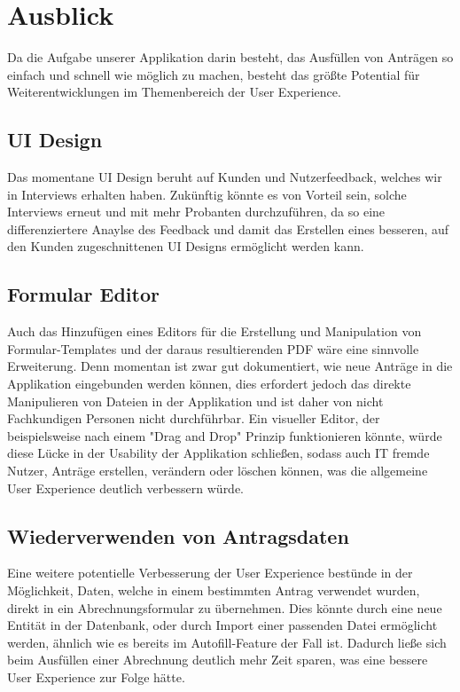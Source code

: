 \chapter{Ausblick}\label{ch:ausblick}

Da die Aufgabe unserer Applikation darin besteht, das Ausfüllen von Anträgen so einfach 
und schnell wie möglich zu machen, besteht das größte Potential für Weiterentwicklungen
im Themenbereich der User Experience.

\section{\ac{UI} Design}\label{sec: ui design}
Das momentane \ac{UI} Design beruht auf Kunden und Nutzerfeedback, welches wir in 
Interviews erhalten haben. Zukünftig könnte es von Vorteil sein, solche Interviews 
erneut und mit mehr Probanten durchzuführen, da so eine differenziertere Anaylse
des Feedback und damit das Erstellen eines besseren, auf den Kunden zugeschnittenen \ac{UI} 
Designs ermöglicht werden kann.

\section{Formular Editor}\label{sec: formular editor}
Auch das Hinzufügen eines Editors für die Erstellung und Manipulation von 
Formular-Templates und der daraus resultierenden PDF wäre eine sinnvolle Erweiterung. Denn 
momentan ist zwar gut dokumentiert, wie neue Anträge in die Applikation eingebunden werden 
können, dies erfordert jedoch das direkte Manipulieren von Dateien in der Applikation 
und ist daher von nicht Fachkundigen Personen nicht durchführbar. Ein visueller Editor, der 
beispielsweise nach einem "Drag and Drop" Prinzip funktionieren könnte, würde diese Lücke 
in der Usability der Applikation schließen, sodass auch IT fremde Nutzer, Anträge 
erstellen, verändern oder löschen können, was die allgemeine User Experience deutlich 
verbessern würde.

\section{Wiederverwenden von Antragsdaten}\label{sec: wiederverwenden von Antragsdaten}
Eine weitere potentielle Verbesserung der User Experience bestünde in der Möglichkeit, 
Daten, welche in einem bestimmten Antrag verwendet wurden, direkt in ein 
Abrechnungsformular zu übernehmen. Dies könnte durch eine neue Entität in der Datenbank, 
oder durch Import einer passenden Datei ermöglicht werden, ähnlich wie es bereits im 
Autofill-Feature der Fall ist. Dadurch ließe sich beim Ausfüllen einer Abrechnung deutlich 
mehr Zeit sparen, was eine bessere User Experience zur Folge hätte.%

